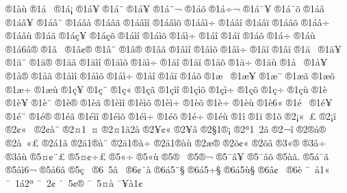 {^^ae1^^e0^^f9
^^ae1^^e1^^a0
^^ae1^^e1^^a1
^^ae1^^e1^^a5
^^ae1^^e1^^a8
^^ae1^^e1^^ad^^a5
^^ae1^^e1^^ad^^a8^^ac
^^ae1^^e1^^ad^^f5
^^ae1^^e1^^ad^^f7^^ac
^^ae1^^e1^^af^^a5
^^ae1^^e1^^af^^f5
^^ae1^^e1^^e2^^a0
^^ae1^^e1^^e2^^a5
^^ae1^^e1^^e2^^a8
^^ae1^^e1^^e2^^e0
^^ae1^^e1^^e2^^e3
^^ae1^^e1^^e2^^ec^^ee
^^ae1^^e1^^e2^^ec^^f5
^^ae1^^e1^^e2^^ec^^f7
^^ae1^^e1^^e2^^ee
^^ae1^^e1^^e2^^ef
^^ae1^^e1^^e2^^f5
^^ae1^^e1^^e2^^f7
^^ae1^^e1^^e2^^f9
^^ae1^^e1^^e3
^^ae1^^e1^^e7^^a5
^^ae1^^e1^^e7^^f5
^^ae1^^e1^^ec^^ee
^^ae1^^e1^^ec^^f5
^^ae1^^e1^^ec^^f7
^^ae1^^e1^^ee
^^ae1^^e1^^ef
^^ae1^^e1^^f5
^^ae1^^e1^^f7
^^ae1^^e1^^f9
^^ae1^^e16^^e2^^ae
^^ae1^^e2^^a0
^^ae1^^e2^^a2^^ae
^^ae1^^e2^^a8
^^ae1^^e2^^ae
^^ae1^^e2^^e3
^^ae1^^e2^^ec^^ee
^^ae1^^e2^^ec^^f5
^^ae1^^e2^^ec^^f7
^^ae1^^e2^^ee
^^ae1^^e2^^ef
^^ae1^^e4^^a0
^^ae1^^e4^^a5
^^ae1^^e4^^a8
^^ae1^^e4^^ae
^^ae1^^e4^^e3
^^ae1^^e4^^ec^^ee
^^ae1^^e4^^ec^^f5
^^ae1^^e4^^ec^^f7
^^ae1^^e4^^ee
^^ae1^^e4^^ef
^^ae1^^e4^^f5
^^ae1^^e4^^f7
^^ae1^^e4^^f9
^^ae1^^e5^^a0
^^ae1^^e5^^a5
^^ae1^^e5^^ae
^^ae1^^e5^^e3
^^ae1^^e5^^ec^^ee
^^ae1^^e5^^ec^^f5
^^ae1^^e5^^ec^^f7
^^ae1^^e5^^ee
^^ae1^^e5^^ef
^^ae1^^e5^^f5
^^ae1^^e6^^a0
^^ae1^^e6^^a5
^^ae1^^e6^^a8
^^ae1^^e6^^e3
^^ae1^^e6^^f5
^^ae1^^e6^^f7
^^ae1^^e6^^f9
^^ae1^^e7^^a5
^^ae1^^e7^^a8
^^ae1^^e7^^ab
^^ae1^^e7^^e3
^^ae1^^e7^^ec^^ee
^^ae1^^e7^^ec^^f5
^^ae1^^e7^^ec^^f7
^^ae1^^e7^^f5
^^ae1^^e7^^f7
^^ae1^^e7^^f9
^^ae1^^e8^^a0
^^ae1^^e8^^a5
^^ae1^^e8^^a8
^^ae1^^e8^^ae
^^ae1^^e8^^e3
^^ae1^^e8^^ec^^ee
^^ae1^^e8^^ec^^f5
^^ae1^^e8^^ec^^f7
^^ae1^^e8^^f5
^^ae1^^e8^^f7
^^ae1^^e8^^f9
^^ae1^^e86^^ab
^^ae1^^e9^^a0
^^ae1^^e9^^a5
^^ae1^^e9^^a8
^^ae1^^e9^^ae
^^ae1^^e9^^e3
^^ae1^^e9^^ec^^ee
^^ae1^^e9^^ec^^f5
^^ae1^^e9^^ec^^f7
^^ae1^^e9^^f5
^^ae1^^e9^^f7
^^ae1^^e9^^f9
^^ae1^^ee
^^ae1^^ef
^^ae1^^f5
^^ae2^^a1^^ab^^a0^^a3
^^ae2^^a1^^ef
^^ae2^^a2^^ab^^a0
^^ae2^^a2^^e0^^a8
^^ae2^^a41^^a0^^a4
^^ae2^^a41^^e32^^e0
^^ae2^^a5^^a2^^ab
^^ae2^^a5^^e2
^^ae2^^a71^^ae^^a1
^^ae2^^aa1^^a02^^e3
^^ae2^^ac^^ee
^^ae2^^ae^^e5^^ae
^^ae2^^e0^^a0^^ab^^a3
^^ae2^^e11^^e3^^ad
^^ae2^^e41^^ae^^e0^^a8
^^ae2^^e41^^ae^^e0^^f7
^^ae2^^e41^^ae^^e0^^f9
^^ae2^^e6^^ae
^^ae2^^f5^^a2^^ab
^^ae2^^f5^^e2
^^ae3^^ab^^ae
^^ae3^^e2^^f7
^^ae3^^e2^^f9
^^ae5^^a4^^a2^^a8^^a3
^^ae5^^a4^^a2^^f7^^a3
^^ae5^^ab^^f7
^^ae5^^ab^^f9
^^ae5^^ae^^a0
^^ae5^^ae^^ac
^^ae5^^af^^e2^^a5
^^ae5^^af^^e2^^f5
^^ae5^^e0^^e3.
^^ae5^^e1^^af^^e3
^^ae5^^e2^^ec6^^ac
^^ae5^^e56^^e2
^^ae5^^e7^^a0
^^ae6^^a05^^e2^^a0
^^ae6^^a2^^af^^e0
^^ae6^^e15^^a8^^a7
^^ae6^^e15^^f7^^a7
^^ae6^^e15^^f9^^a7
^^ae6^^e2^^a2^^a0
^^ae6^^e8^^ad
^^af^^a0^^e51^^ab
^^af^^a01^^e12^^aa
^^af^^a02^^a2
^^af^^a05^^a2^^ae
^^af^^a05^^a4^^e0
^^af^^a5^^e01^^a2
}
